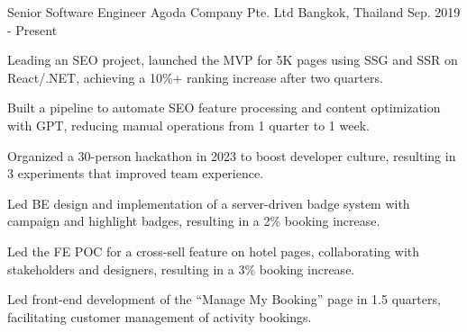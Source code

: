 

\begin{cventries}

  \cventry
  {Senior Software Engineer} %
  {Agoda Company Pte. Ltd} %
  {Bangkok, Thailand} %
  {Sep. 2019 - Present} %
  {
    \begin{cvitems} %
      \item {Leading an SEO project, launched the MVP for 5K pages using SSG and SSR on React/.NET, achieving a 10\%+ ranking increase after two quarters.}
      \item {Built a pipeline to automate SEO feature processing and content optimization with GPT, reducing manual operations from 1 quarter to 1 week.}
      \item {Organized a 30-person hackathon in 2023 to boost developer culture, resulting in 3 experiments that improved team experience.}
      \item {Led BE design and implementation of a server-driven badge system with campaign and highlight badges, resulting in a 2\% booking increase.}
      \item {Led the FE POC for a cross-sell feature on hotel pages, collaborating with stakeholders and designers, resulting in a 3\% booking increase.}
      \item {Led front-end development of the “Manage My Booking” page in 1.5 quarters, facilitating customer management of activity bookings.}

\end{cvitems}}
\end{cventries}

